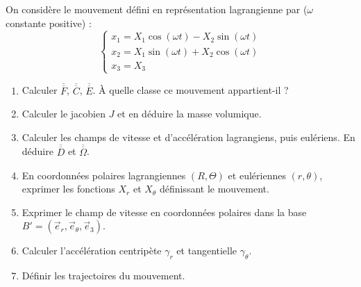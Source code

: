 \documentclass[12pt,a4paper]{article}
\begin{document}
\begin{boiteexercice}
On considère le mouvement défini en représentation lagrangienne par ($\omega$ constante positive) :
\[
\begin{cases}
x_1 = X_1\cos(\omega t) - X_2\sin(\omega t)\\
x_2 = X_1\sin(\omega t) + X_2\cos(\omega t)\\
x_3 = X_3
\end{cases}
\]
\begin{enumerate}
  \item Calculer $\overline{\overline{F}}$, $\overline{\overline{C}}$, $\overline{\overline{E}}$. À quelle classe ce mouvement appartient-il ?
  \item Calculer le jacobien $J$ et en déduire la masse volumique.
  \item Calculer les champs de vitesse et d'accélération lagrangiens, puis eulériens. En déduire $\overline{\overline{D}}$ et $\overline{\overline{\Omega}}$.
  \item En coordonnées polaires lagrangiennes $(R,\Theta)$ et eulériennes $(r,\theta)$, exprimer les fonctions $X_r$ et $X_\theta$ définissant le mouvement.
  \item Exprimer le champ de vitesse en coordonnées polaires dans la base $B' = (\vec{e}_r, \vec{e}_\theta, \vec{e}_3)$.
  \item Calculer l'accélération centripète $\gamma_r$ et tangentielle $\gamma_\theta$.
  \item Définir les trajectoires du mouvement.
\end{enumerate}
\end{boiteexercice}
\end{document}
